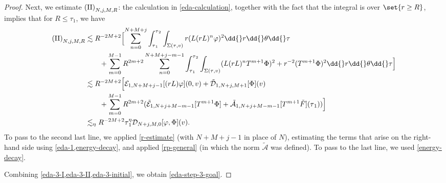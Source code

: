 \documentclass[10pt, reqno]{amsart}
\begin{document}
\begin{proof}
Next, we estimate \(\textnormal{(II)}_{N,j,M,R}\): the calculation in \cref{eda-calculation}, together with the fact that the
integral is over \(\set{r\ge R}\), implies that for \(R\le \tau_1\), we have
\begin{equation}\label{eda-3-II}
\begin{split}
\textnormal{(II)}_{N,j,M,R} &\lesssim R^{-2M+2}\Bigl[\sum_{n=0}^{N+M+j}\int_{\tau{}_1}^{\tau{}_2}\int _{\Sigma{}(\tau{},v)} r(L(rL)^{n}\varphi{})^2\dd{}r\dd{}\theta{}\dd{}\tau{} \\
&\qquad + \sum_{m=0}^{M-1}R^{2m + 2}\sum_{n=0}^{N+M+j-m-1}\int_{\tau{}_1}^{\tau{}_2}\int _{\Sigma{}(\tau{},v)} (L(rL)^nT^{m+1}\Phi{})^2 + r^{-2}(T^{m+1}\Phi{})^2 \dd{}r\dd{}\theta{}\dd{}\tau{}\Bigr] \\
&\lesssim  R^{-2M+2}\Bigl[\mathcal{E}_{1,N+M+j-1}[(rL)\varphi{}](0,v) + \tilde{\mathcal{D}}_{1,N+j,M+1}[\Phi{}](v) \\
&\qquad + \sum_{m=0}^{M-1}R^{2m+2} (\tilde{\mathcal{E}}_{1,N+j+M-m-1}[T^{m+1}\Phi{}] + \tilde{\mathcal{A}}_{1,N+j+M-m-1}[T^{m+1}\tilde{F}](\tau{}_1))\Bigr] \\
&\lesssim_\eta{}  R^{-2M+2}\tau{}_1^\eta{}\mathcal{D}_{N+j,M,0}[\varphi{},\Phi{}](v).
\end{split}
\end{equation}
To pass to the second last line, we applied \cref{r-estimate} (with \(N + M + j-1\)
in place of \(N\)), estimating the terms that arise on the right-hand side using
\cref{eda-1,energy-decay}, and applied \cref{rp-general} (in which the norm
\(\tilde{\mathcal{A}}\) was defined). To pass to the last line, we used \cref{energy-decay}.

Combining \cref{eda-3-I,eda-3-II,eda-3-initial}, we obtain \cref{eda-step-3-goal}.


\end{proof}
\end{document}
